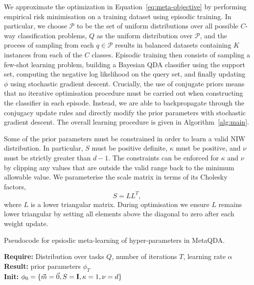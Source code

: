\documentclass[10pt,twocolumn,letterpaper]{article}
\begin{document}
We approximate the optimization in Equation~\ref{eq:meta-objective} by performing empirical risk minimisation on a training dataset using episodic training. In particular, we choose $\mathcal{P}$ to be the set of uniform distributions over all possible $C$-way classification problems, $Q$ as the uniform distribution over $\mathcal{P}$, and the process of sampling from each $q \in \mathcal{P}$ results in balanced datasets containing $K$ instances from each of the $C$ classes. Episodic training then consists of sampling a few-shot learning problem, building a Bayesian QDA classifier using the support set, computing the negative log likelihood on the query set, and finally updating $\phi$ using stochastic gradient descent. Crucially, the use of conjugate priors means that no iterative optimisation procedure must be carried out when constructing the classifier in each episode. Instead, we are able to backpropagate through the conjugacy update rules and directly modify the prior parameters with stochastic gradient descent. The overall learning procedure is given in Algorithm~\ref{alg:main}.

Some of the prior parameters must be constrained in order to learn a valid NIW distribution. In particular, $S$ must be positive definite, $\kappa$ must be positive, and $\nu$ must be strictly greater than $d-1$. The constraints can be enforced for $\kappa$ and $\nu$ by clipping any values that are outside the valid range back to the minimum allowable value. We parameterise the scale matrix in terms of its Cholesky factors,
\begin{equation}\label{eq:decomp}
    S = LL^T,
\end{equation}
where $L$ is a lower triangular matrix. During optimisation we ensure $L$ remains lower triangular by setting all elements above the diagonal to zero after each weight update.



\begin{algorithm}[t]
\caption{Pseudocode for epsiodic meta-learning of hyper-parameters in MetaQDA.}\label{alg:main}
\textbf{Require:} Distribution over tasks $Q$, number of iterations $T$, learning rate $\alpha$ \\
\textbf{Result:} prior parameters $\phi_T$ \\
\textbf{Init:} $\phi_0 = \{ \vec m = \vec{0}, S = \bold{I}, \kappa=1, \nu=d\}$ \\
\end{algorithm}
\end{document}
